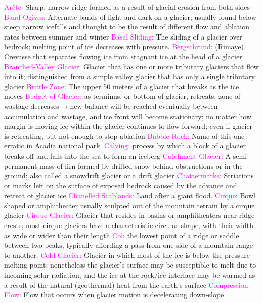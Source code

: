 \documentclass{article}
\newcommand{\pink}[1]{\textcolor{magenta}{#1}}
\newcommand{\vocab}[1]{{\pink{#1}}}
\begin{document}
\begin{multicols*}{4}
		\vocab{        Arête: } Sharp, narrow ridge formed as a result of glacial erosion from both sides   
		\vocab{        Band Ogives: } Alternate bands of light and dark on a glacier; usually found below steep narrow icefalls and thought to be the result of different flow and ablation rates between summer and winter 
		\vocab{        Basal Sliding: } The sliding of a glacier over bedrock; melting point of ice decreases with pressure.  
		\vocab{        Bergschrund: } (Rimaye) Crevasse that separates flowing ice from stagnant ice at the head of a glacier 
		\vocab{        Branched-Valley Glacier: } Glacier that has one or more tributary glaciers that flow into it; distinguished from a simple valley glacier that has only a single tributary glacier 
		\vocab{       Brittle Zone: }The upper 50 meters of a glacier that breaks as the ice moves
		\vocab{Budget of Glacier: } as terminus, or bottom of glacier, retreats, zone of wastage decreases$ \rightarrow $new balance will be reached eventually between accumulation and wastage, and ice front will become stationary; no matter how margin is moving ice within the glacier continues to flow forward; even if glacier is retreating, but not enough to stop ablation 
		\vocab{Bubble Rock: } Name of this one erratic in Acadia national park.
		\vocab{Calving: } process by which a block of a glacier breaks off and falls into the sea to form an iceberg  
		\vocab{        Catchment Glacier: } A semi permanent mass of firn formed by drifted snow behind obstructions or in the ground; also called a snowdrift glacier or a drift glacier 
		\vocab{        Chattermarks: } Striations or marks left on the surface of exposed bedrock caused by the advance and retreat of glacier ice
		\vocab{Chanelled Scablands: } Land after a giant flood. 
		\vocab{        Cirque: } Bowl shaped or amphitheater usually sculpted out of the mountain terrain by a cirque glacier 
		\vocab{        Cirque Glacier: } Glacier that resides in basins or amphitheaters near ridge crests; most cirque glaciers have a characteristic circular shape, with their width as wide or wider than their length 
		\vocab{Col: } the lowest point of a ridge or saddle between two peaks, typically affording a pass from one side of a mountain range to another. 
		\vocab{        Cold Glacier: } Glacier in which most of the ice is below the pressure melting point; nonetheless the glacier’s surface may be susceptible to melt due to incoming solar radiation, and the ice at the rock/ice interface may be warmed as a result of the natural (geothermal) heat from the earth’s surface 
		\vocab{        Compression Flow: } Flow that occurs when glacier motion is decelerating down-slope 

\end{multicols*}
\end{document}
